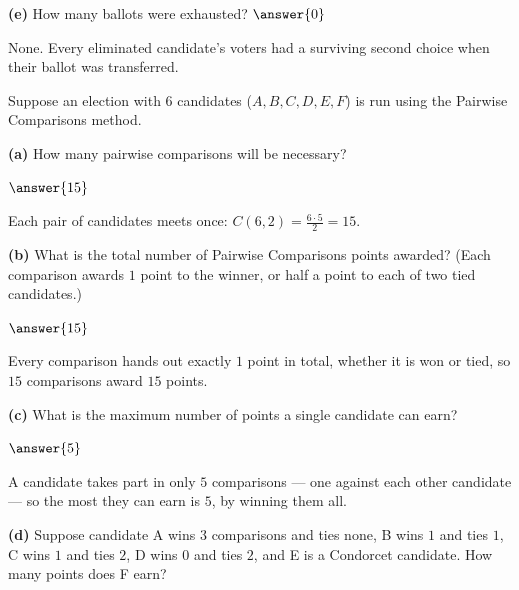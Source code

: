 \documentclass[12pt]{ximera}
\begin{document}
\begin{problem}
\begin{prompt}
\textbf{(e)} How many ballots were exhausted? $\answer{0}$

\begin{feedback}
None. Every eliminated candidate's voters had a surviving second choice when their
ballot was transferred.
\end{feedback}
\end{prompt}
\end{problem}

\begin{problem}
Suppose an election with 6 candidates ($A,B,C,D,E,F$) is run using the Pairwise Comparisons
method.

\begin{prompt}
\textbf{(a)} How many pairwise comparisons will be necessary?

$\answer{15}$

\begin{feedback}
Each pair of candidates meets once: $C(6,2)=\frac{6\cdot 5}{2}=15$.
\end{feedback}
\end{prompt}

\begin{prompt}
\textbf{(b)} What is the total number of Pairwise Comparisons points awarded? (Each
comparison awards $1$ point to the winner, or half a point to each of two tied
candidates.)

$\answer{15}$

\begin{feedback}
Every comparison hands out exactly $1$ point in total, whether it is won or tied, so
$15$ comparisons award $15$ points.
\end{feedback}
\end{prompt}

\begin{prompt}
\textbf{(c)} What is the maximum number of points a single candidate can earn?

$\answer{5}$

\begin{feedback}
A candidate takes part in only $5$ comparisons --- one against each other candidate
--- so the most they can earn is $5$, by winning them all.
\end{feedback}
\end{prompt}

\begin{prompt}
\textbf{(d)} Suppose candidate A wins $3$ comparisons and ties none, B wins $1$ and ties $1$, C wins $1$ and
ties $2$, D wins $0$ and ties $2$, and E is a Condorcet candidate. How many points does F earn?


\end{prompt}
\end{problem}
\end{document}
